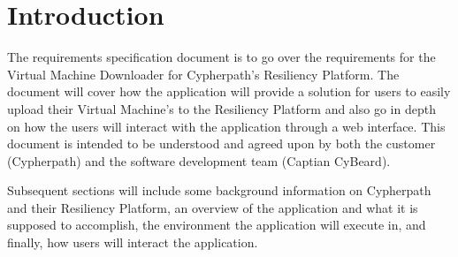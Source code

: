 \documentclass{article}
\begin{document}
    

    \tableofcontents
    \listoffigures

    \newpage
    \begin{versionhistory}
    \end{versionhistory}
    \newpage

    \section{Introduction}
    The requirements specification document is to go over the requirements for the Virtual Machine Downloader for Cypherpath's Resiliency Platform.
    The document will cover how the application will provide a solution for users to easily upload their Virtual Machine's to the Resiliency Platform and also
    go in depth on how the users will interact with the application through a web interface. This document is intended to be understood and agreed
    upon by both the customer (Cypherpath) and the software development team (Captian CyBeard).

    Subsequent sections will include some background information on Cypherpath and their Resiliency Platform, an overview of the application and what it
    is supposed to accomplish, the environment the application will execute in, and finally, how users will interact the application.

    
\end{document}
